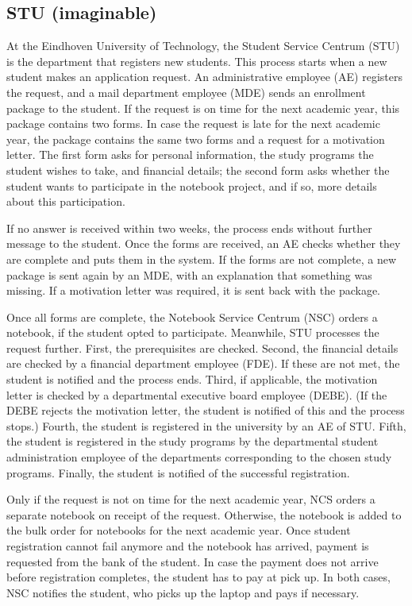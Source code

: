 \subsection{STU (imaginable)}

At the Eindhoven University of Technology, the Student Service Centrum
(STU) is the department that registers new students.
This process starts when a new student makes an application request.
An administrative employee (AE) registers the request, and a mail department employee (MDE) sends an enrollment package to the student.
If the request is on time for the next academic year, this package contains two forms.
In case the request is late for the next academic year, the package contains the same two forms and a request for a motivation letter.
The first form asks for personal information, the study programs the student wishes to take, and financial details;
the second form asks whether the student wants to participate in the notebook project, and if so, more details about this participation.

If no answer is received within two weeks, the process ends without further message to the student.
Once the forms are received, an AE checks whether they are complete and puts them in the system.
If the forms are not complete, a new package is sent again by an MDE, with an explanation that something was missing.
If a motivation letter was required, it is sent back with the package.

Once all forms are complete, the Notebook Service Centrum (NSC) orders
a notebook, if the student opted to participate.
Meanwhile, STU processes the request further.
First, the prerequisites are checked.
Second, the financial details are checked by a financial department employee (FDE).
If these are not met, the student is notified and the process ends.
Third, if applicable, the motivation letter is checked by a departmental executive board employee (DEBE).
(If the DEBE rejects the motivation letter, the student is notified of this and the process stops.)
Fourth, the student is registered in the university by an AE of STU.
Fifth, the student is registered in the study programs by the departmental student administration
employee of the departments corresponding to the chosen study programs.
Finally, the student is notified of the successful registration.

Only if the request is not on time for the next academic year, NCS orders a separate notebook on receipt of the request.
Otherwise, the notebook is added to the bulk order for notebooks for the next academic year.
Once student registration cannot fail anymore and the notebook has arrived, payment is requested from the bank of the student.
In case the payment does not arrive before registration completes, the student has to pay at pick up.
In both cases, NSC notifies the student, who picks up the laptop and pays if necessary.

\clearpage
